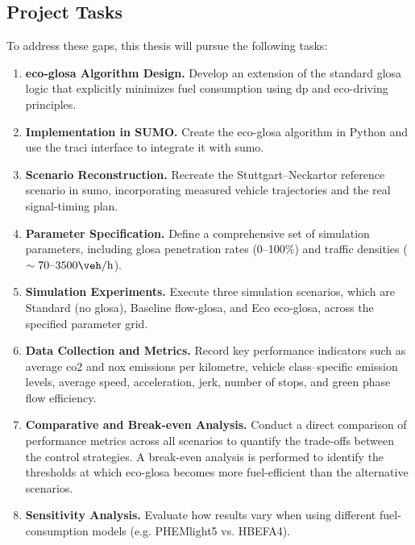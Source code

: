 \subsection{Project Tasks}
\label{subsec:Project_Tasks}
To address these gaps, this thesis will pursue the following tasks:
\begin{enumerate}
    \item \textbf{\ac{eco-glosa} Algorithm Design.} Develop an extension of the standard \ac{glosa} logic that explicitly minimizes fuel consumption using \ac{dp} and eco-driving principles.
    \item \textbf{Implementation in SUMO.} Create the \ac{eco-glosa} algorithm in Python and use the \ac{traci} interface to integrate it with \ac{sumo}.
    \item \textbf{Scenario Reconstruction.} Recreate the Stuttgart–Neckartor reference scenario in \ac{sumo}, incorporating measured vehicle trajectories and the real signal-timing plan.
    \item \textbf{Parameter Specification.} Define a comprehensive set of simulation parameters, including \ac{glosa} penetration rates (0–100\%) and traffic densities ($\sim 70\text{--}3500\unit{\veh\per\hour}$).
    \item \textbf{Simulation Experiments.} Execute three simulation scenarios, which are Standard (no \ac{glosa}), Baseline \ac{flow-glosa}, and Eco \ac{eco-glosa}, across the specified parameter grid.
    \item \textbf{Data Collection and Metrics.} Record key performance indicators such as average \ac{co2} and \ac{nox} emissions per kilometre, vehicle class–specific emission levels, average speed, acceleration, jerk, number of stops, and green phase flow efficiency.
    \item \textbf{Comparative and Break-even Analysis.} Conduct a direct comparison of performance metrics across all scenarios to quantify the trade-offs between the control strategies. A break-even analysis is performed to identify the thresholds at which \ac{eco-glosa} becomes more fuel-efficient than the alternative scenarios.
    \item \textbf{Sensitivity Analysis.}  Evaluate how results vary when using different fuel‐consumption models (e.g. PHEMlight5 vs. HBEFA4).
\end{enumerate}
